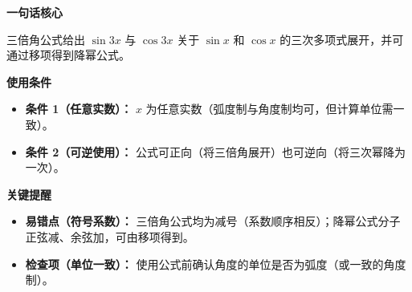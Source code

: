 \begin{summarybox}
	\textbf{\textcolor{CSummary}{一句话核心}}

	三倍角公式给出 $\sin 3x$ 与 $\cos 3x$ 关于 $\sin x$ 和 $\cos x$ 的三次多项式展开，并可通过移项得到降幂公式。

	\medskip
	\textbf{\textcolor{CSummary}{使用条件}}
	\begin{itemize}[leftmargin=*, itemsep=0.5em, topsep=0.4em]
		\item \textbf{条件 1（任意实数）：} $x$ 为任意实数（弧度制与角度制均可，但计算单位需一致）。
		\item \textbf{条件 2（可逆使用）：} 公式可正向（将三倍角展开）也可逆向（将三次幂降为一次）。
	\end{itemize}

	\medskip
	\textbf{\textcolor{CSummary}{关键提醒}}
	\begin{itemize}[leftmargin=*, itemsep=0.5em, topsep=0.4em]
		\item \textbf{易错点（符号系数）：} 三倍角公式均为减号（系数顺序相反）；降幂公式分子正弦减、余弦加，可由移项得到。
		\item \textbf{检查项（单位一致）：} 使用公式前确认角度的单位是否为弧度（或一致的角度制）。
	\end{itemize}
\end{summarybox}
